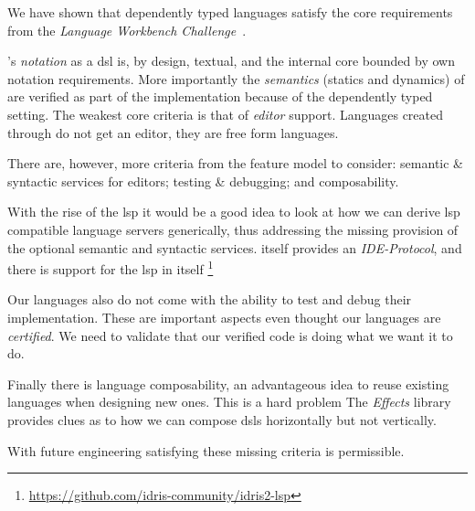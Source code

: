 
We have shown that dependently typed languages satisfy the core requirements from the \emph{Language Workbench Challenge}~\cite{DBLP:conf/sle/ErdwegSVBBCGHKLKMPPSSSVVVWW13}.

\Velo{}'s \emph{notation} as a \ac{dsl} is, by design, textual, and the internal core bounded by \Idris{} own notation requirements.
%
More importantly the \emph{semantics} (statics and dynamics) of \Velo{} are verified as part of the implementation because of the dependently typed setting.
%
The weakest core criteria is that of \emph{editor} support.
%
Languages created through \Idris{} do not get an editor, they are free form languages.

%
There are, however, more criteria from the feature model to consider:
%
semantic \& syntactic services for editors;
%
testing \& debugging;
%
and
%
composability.
%

With the rise of the \ac{lsp} it would be a good idea to look at how we can derive \ac{lsp} compatible language servers generically, thus addressing the missing provision of the optional semantic and syntactic services.
\Idris{} itself provides an \emph{IDE-Protocol}, and there is support for the \ac{lsp} in \Idris{} itself
\footnote{\url{https://github.com/idris-community/idris2-lsp}}


Our languages also do not come with the ability to test and debug their implementation.
These are important aspects even thought our languages are \emph{certified}.
%
We need to validate that our verified code is doing what we want it to do.


Finally there is language composability, an advantageous idea to reuse existing languages when designing new ones.
This is a hard problem
The \emph{Effects} library~\cite{DBLP:conf/icfp/Brady13} provides clues as to how we can compose \acp{dsl} horizontally but not vertically.

With future engineering satisfying these missing criteria is permissible.


